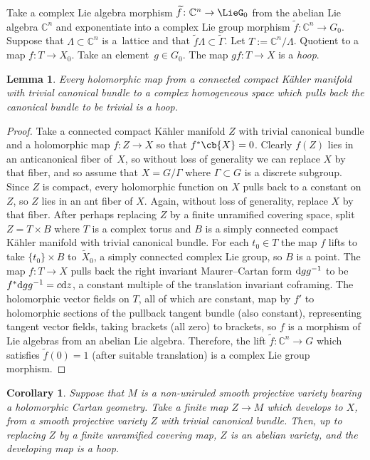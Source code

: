 \documentclass[10pt,a4paper]{amsart}
\providecommand{\C}{}
\numberwithin{equation}{section}
\newtheorem{Corollary}[Theorem]{Corollary}
\newtheorem{Lemma}[Theorem]{Lemma}
\renewcommand{\C}{\mathbb{C}}
\newcommand{\GZ}{G_0}
\newcommand{\LieGZ}{\LieG_0}
\begin{document}
Take a complex Lie algebra morphism
$
\widetilde{f} \colon \C^{n} \to \LieGZ
$
from the abelian Lie algebra $\C^{n}$ and exponentiate into a complex Lie group morphism
$
\widetilde{f} \colon \C^{n} \to \GZ.
$
Suppose that $\Lambda \subset \C^{n}$ is a~lattice and that $\widetilde{f}\Lambda \subset \widetilde{\Gamma}$.
Let $T := \C^{n}/\Lambda$.
Quotient to a map $f \colon T \to X_0$.
Take an element~${g \in \GZ}$.
The map $gf \colon T \to X$ is a \emph{hoop}.

\begin{Lemma}\label{lemma:is.a.hoop}
Every holomorphic map from a connected compact K\"ahler manifold with trivial canonical bundle to a complex homogeneous space which pulls back the canonical bundle to be trivial is a hoop.
\end{Lemma}

\begin{proof}
Take a connected compact K\"ahler manifold $Z$ with trivial canonical bundle and a holomorphic map $f \colon Z \to X$ so that $f^* \cb{X}=0$.
Clearly $f(Z)$ lies in an anticanonical fiber of~$X$, so without loss of generality we can replace $X$ by that fiber, and so assume that $X=G/\Gamma$ where $\Gamma \subset G$ is a discrete subgroup.
Since $Z$ is compact, every holomorphic function on $X$ pulls back to a constant on $Z$, so $Z$ lies in an ant fiber of $X$.
Again, without loss of generality, replace $X$ by that fiber.
After perhaps replacing $Z$ by a finite unramified covering space, split~$Z = T \times B$ where $T$ is a complex torus and $B$ is a simply connected compact K\"ahler manifold with trivial canonical bundle.
For each $t_0 \in T$ the map $f$ lifts to take $\{t_0\} \times B$ to~$\widetilde{X}_0$, a simply connected complex Lie group, so $B$ is a point.
The map $f \colon T \to X$ pulls back the right invariant Maurer--Cartan form ${\rm d}g g^{-1}$ to be $f^* {\rm d}g g^{-1}
 = c {\rm d}z$, a constant multiple of the translation invariant coframing.
The holomorphic vector fields on $T$, all of which are constant, map by $f'$ to holomorphic sections of the pullback tangent bundle (also constant), representing tangent vector fields, taking brackets (all zero) to brackets, so $f$ is a morphism of Lie algebras from an abelian Lie algebra.
Therefore, the lift $\widetilde{f} \colon \C^{n} \to G$ which satisfies $\widetilde{f}(0)=1$ (after suitable translation) is a complex Lie group morphism.
\end{proof}
\begin{Corollary}\label{corollary:hoops}
Suppose that $M$ is a non-uniruled smooth projective variety bearing a holomorphic Cartan geometry.
Take a finite map $Z \to M$ which develops to $X$, from a smooth projective variety $Z$ with trivial canonical bundle.
Then, up to replacing $Z$ by a finite unramified covering map, $Z$ is an abelian variety, and the developing map is a hoop.
\end{Corollary}
\end{document}
